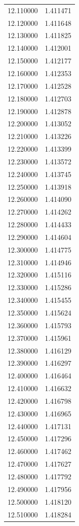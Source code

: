 \begin{tabular}{rr}
12.110000 & 1.411471 \\
12.120000 & 1.411648 \\
12.130000 & 1.411825 \\
12.140000 & 1.412001 \\
12.150000 & 1.412177 \\
12.160000 & 1.412353 \\
12.170000 & 1.412528 \\
12.180000 & 1.412703 \\
12.190000 & 1.412878 \\
12.200000 & 1.413052 \\
12.210000 & 1.413226 \\
12.220000 & 1.413399 \\
12.230000 & 1.413572 \\
12.240000 & 1.413745 \\
12.250000 & 1.413918 \\
12.260000 & 1.414090 \\
12.270000 & 1.414262 \\
12.280000 & 1.414433 \\
12.290000 & 1.414604 \\
12.300000 & 1.414775 \\
12.310000 & 1.414946 \\
12.320000 & 1.415116 \\
12.330000 & 1.415286 \\
12.340000 & 1.415455 \\
12.350000 & 1.415624 \\
12.360000 & 1.415793 \\
12.370000 & 1.415961 \\
12.380000 & 1.416129 \\
12.390000 & 1.416297 \\
12.400000 & 1.416464 \\
12.410000 & 1.416632 \\
12.420000 & 1.416798 \\
12.430000 & 1.416965 \\
12.440000 & 1.417131 \\
12.450000 & 1.417296 \\
12.460000 & 1.417462 \\
12.470000 & 1.417627 \\
12.480000 & 1.417792 \\
12.490000 & 1.417956 \\
12.500000 & 1.418120 \\
12.510000 & 1.418284 \\

\end{tabular}
